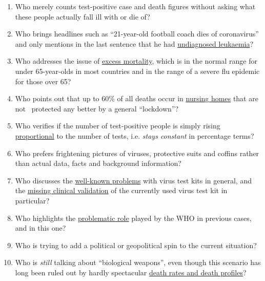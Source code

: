 \begin{enumerate}
\def\labelenumi{\arabic{enumi}.}
\tightlist
\item
  Who merely counts test-positive case and death figures without asking
  what these people actually fall ill with or die of?
\item
  Who brings headlines such as ``21-year-old football coach dies of
  coronavirus'' and only mentions in the last sentence that he had
  \href{https://sports.yahoo.com/spanish-football-coach-francisco-garcia-163153573.html}{undiagnosed
  leukaemia}?
\item
  Who addresses the issue of
  \href{https://www.euromomo.eu/index.html}{excess mortality}, which is
  in the normal range for under 65-year-olds in most countries and in
  the range of a severe flu epidemic for those over 65?
\item
  Who points out that up to 60\% of all deaths occur in
  \href{https://ltccovid.org/2020/04/12/mortality-associated-with-covid-19-outbreaks-in-care-homes-early-international-evidence/}{nursing
  homes} that are not~ protected any better by a general ``lockdown''?
\item
  Who verifies if the number of test-positive people is simply rising
  \href{https://multipolar-magazin.de/artikel/coronavirus-irrefuhrung-fallzahlen}{proportional}
  to the number of tests, i.e. \emph{stays constant} in percentage
  terms?
\item
  Who prefers frightening pictures of viruses, protective suits and
  coffins rather than actual data, facts and background information?
\item
  Who discusses the
  \href{https://www.ncbi.nlm.nih.gov/pmc/articles/PMC2095096/}{well-known
  problems} with virus test kits in general, and the
  \href{https://www.creative-diagnostics.com/sars-cov-2-coronavirus-multiplex-rt-qpcr-kit-277854-457.htm}{missing
  clinical validation} of the currently used virus test kit in
  particular?
\item
  Who highlights the
  \href{https://www.forbes.com/2010/02/05/world-health-organization-swine-flu-pandemic-opinions-contributors-michael-fumento.html\#208eef4048e8}{problematic
  role} played by the WHO in previous cases, and in this one?
\item
  Who is trying to add a political or geopolitical spin to the current
  situation?
\item
  Who is \emph{still} talking about ``biological weapons'', even though
  this scenario has long been ruled out by hardly spectacular
  \href{https://www.statnews.com/2020/03/17/a-fiasco-in-the-making-as-the-coronavirus-pandemic-takes-hold-we-are-making-decisions-without-reliable-data/}{death
  rates and death profiles}?
\end{enumerate}

